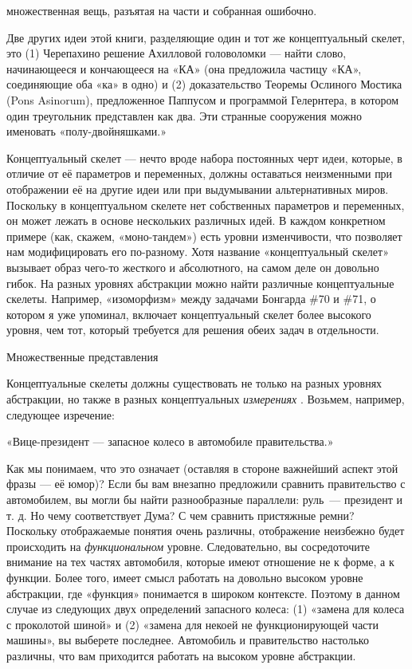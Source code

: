 \documentclass[../main.tex]{subfiles}
\begin{document}
множественная вещь, разъятая на части и собранная ошибочно.

Две других идеи этой книги, разделяющие один и тот же концептуальный скелет, это (1) Черепахино решение Ахилловой головоломки --- найти слово, начинающееся и кончающееся на «КА» (она предложила частицу «КА», соединяющие оба «ка» в одно) и (2) доказательство Теоремы Ослиного Мостика (Pons Asinorum), предложенное Паппусом и программой Гелернтера, в котором один треугольник представлен как два. Эти странные сооружения можно именовать «полу-двойняшками.»

Концептуальный скелет --- нечто вроде набора постоянных черт идеи, которые, в отличие от её параметров и переменных, должны оставаться неизменными при отображении её на другие идеи или при выдумывании альтернативных миров. Поскольку в концептуальном скелете нет собственных параметров и переменных, он может лежать в основе нескольких различных идей. В каждом конкретном примере (как, скажем, «моно-тандем») есть уровни изменчивости, что позволяет нам модифицировать его по-разному. Хотя название «концептуальный скелет» вызывает образ чего-то жесткого и абсолютного, на самом деле он довольно гибок. На разных уровнях абстракции можно найти различные концептуальные скелеты. Например, «изоморфизм» между задачами Бонгарда \#70 и \#71, о котором я уже упоминал, включает концептуальный скелет более высокого уровня, чем тот, который требуется для решения обеих задач в отдельности.

Множественные представления

Концептуальные скелеты должны существовать не только на разных уровнях абстракции, но также в разных концептуальных \emph{измерениях} . Возьмем, например, следующее изречение:

«Вице-президент --- запасное колесо в автомобиле правительства.»

Как мы понимаем, что это означает (оставляя в стороне важнейший аспект этой фразы --- её юмор)? Если бы вам внезапно предложили сравнить правительство с автомобилем, вы могли бы найти разнообразные параллели: руль~--- президент и т. д. Но чему соответствует Дума? С чем сравнить пристяжные ремни? Поскольку отображаемые понятия очень различны, отображение неизбежно будет происходить на \emph{функциональном} уровне. Следовательно, вы сосредоточите внимание на тех частях автомобиля, которые имеют отношение не к форме, а к функции. Более того, имеет смысл работать на довольно высоком уровне абстракции, где «функция» понимается в широком контексте. Поэтому в данном случае из следующих двух определений запасного колеса: (1) «замена для колеса с проколотой шиной» и (2) «замена для некоей не функционирующей части машины», вы выберете последнее. Автомобиль и правительство настолько различны, что вам приходится работать на высоком уровне абстракции.
\end{document}
